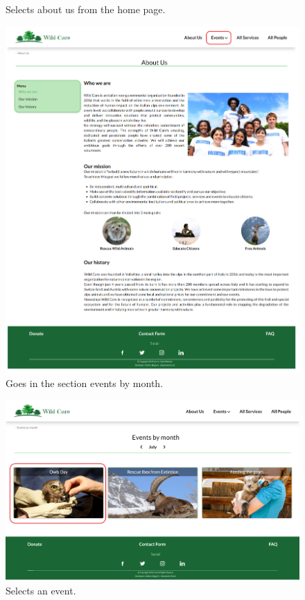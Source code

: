 \begin{figure}[h!]
\begin{minipage}[b]{0.8\textwidth}
			\caption{Selects about us from the home page.}
		\end{minipage}
	\end{figure}

	\begin{figure}[h!]
		\centering
		\begin{minipage}[b]{1\textwidth}
    			\includegraphics[width=\textwidth]{./assets/mockups/aboutus_eventsbymonth.png}
			\caption{Goes in the section events by month.}
		\end{minipage}
	\end{figure}

	\begin{figure}[h!]
		\centering
		\begin{minipage}[b]{1\textwidth}
    			\includegraphics[width=\textwidth]{./assets/mockups/eventsbymonth_event.png}
			\caption{Selects an event.}
		\end{minipage}
	\end{figure}

